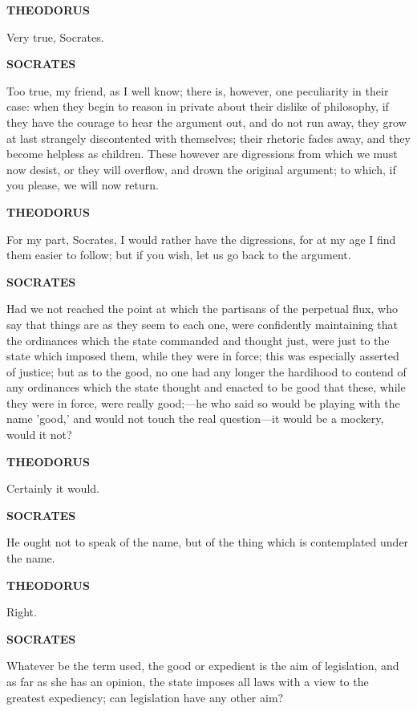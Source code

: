 \documentclass[11pt,letter]{article}
\begin{document}
\par \textbf{THEODORUS}
\par   Very true, Socrates.

\par \textbf{SOCRATES}
\par   Too true, my friend, as I well know; there is, however, one peculiarity in their case:  when they begin to reason in private about their dislike of philosophy, if they have the courage to hear the argument out, and do not run away, they grow at last strangely discontented with themselves; their rhetoric fades away, and they become helpless as children. These however are digressions from which we must now desist, or they will overflow, and drown the original argument; to which, if you please, we will now return.

\par \textbf{THEODORUS}
\par   For my part, Socrates, I would rather have the digressions, for at my age I find them easier to follow; but if you wish, let us go back to the argument.

\par \textbf{SOCRATES}
\par   Had we not reached the point at which the partisans of the perpetual flux, who say that things are as they seem to each one, were confidently maintaining that the ordinances which the state commanded and thought just, were just to the state which imposed them, while they were in force; this was especially asserted of justice; but as to the good, no one had any longer the hardihood to contend of any ordinances which the state thought and enacted to be good that these, while they were in force, were really good;—he who said so would be playing with the name 'good,' and would not touch the real question—it would be a mockery, would it not?

\par \textbf{THEODORUS}
\par   Certainly it would.

\par \textbf{SOCRATES}
\par   He ought not to speak of the name, but of the thing which is contemplated under the name.

\par \textbf{THEODORUS}
\par   Right.

\par \textbf{SOCRATES}
\par   Whatever be the term used, the good or expedient is the aim of legislation, and as far as she has an opinion, the state imposes all laws with a view to the greatest expediency; can legislation have any other aim?
\end{document}
